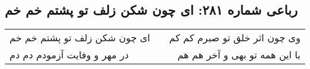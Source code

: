 \begin{center}
\section*{رباعی شماره ۲۸۱: ای چون شکن زلف تو پشتم خم خم}
\label{sec:sh281}
\begin{longtable}{l p{0.5cm} r}
ای چون شکن زلف تو پشتم خم خم
&&
وی چون اثر خلق تو صبرم کم کم
\\
در مهر و وفایت آزمودم دم دم
&&
با این همه تو بهی و آخر هم هم
\\
\end{longtable}
\end{center}
